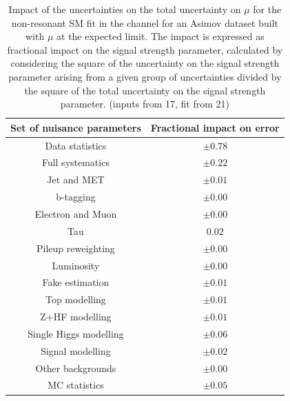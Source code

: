 \begin{table}
\centering
\begin{tabular}{|c|c|}
\hline
Set of nuisance parameters & Fractional impact on error\\
\hline
Data statistics & $\pm 0.78$\\
Full systematics & $\pm 0.22$\\
Jet and MET & $\pm 0.01$ \\
b-tagging & $\pm 0.00$\\
Electron and Muon & $\pm 0.00$\\
Tau & $0.02$\\
Pileup reweighting & $\pm 0.00$\\
Luminosity & $\pm 0.00$\\
Fake estimation & $\pm 0.01$\\
Top modelling & $\pm 0.01$\\ 
Z+HF modelling & $\pm 0.01$\\
Single Higgs modelling & $\pm 0.06$\\
Signal modelling & $\pm 0.02$\\
Other backgrounds & $\pm 0.00$\\
MC statistics & $\pm 0.05$\\
\hline
\end{tabular}
\caption{Impact of the uncertainties on the total uncertainty on $\mu$ for the non-resonant SM fit in the \hadhad channel for an Asimov dataset built with $\mu$ at the expected limit. The impact is expressed as fractional impact on the signal strength parameter,  calculated by considering the square of the uncertainty on the signal strength parameter arising from a given group of uncertainties divided by the square of the total uncertainty on the signal strength parameter.  (inputs from 17, fit from 21)}
\label{sec:fit:tab:HadHadBreakdownSMAsimov}
\end{table}

